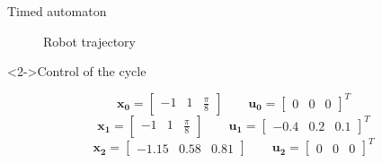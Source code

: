 \documentclass[10pt, xcolor={usenames, dvipsnames}]{beamer}
\begin{document}
\begin{frame}{Timed automaton}
\begin{minipage}[c]{.45\textwidth}
\begin{figure}
                    \caption{Robot trajectory}
                \end{figure}
            \end{minipage}
            \begin{minipage}{.85\textwidth}
                \begin{block}<2->{Control of the cycle}
                    \vspace{2.5mm}
                    \begin{overprint}
                        $$\mathbf{x_0} = \begin{bmatrix}-1& 1& \frac{\pi}{8}\end{bmatrix} \qquad \mathbf{u_0} = \begin{bmatrix}0& 0& 0\end{bmatrix}^T$$
                        $$\mathbf{x_1} = \begin{bmatrix}-1& 1& \frac{\pi}{8}\end{bmatrix} \qquad \mathbf{u_1} = \begin{bmatrix}-0.4& 0.2& 0.1\end{bmatrix}^T$$
                        $$\mathbf{x_2} = \begin{bmatrix}-1.15& 0.58& 0.81\end{bmatrix} \qquad \mathbf{u_2} = \begin{bmatrix}0& 0& 0\end{bmatrix}^T$$
                    \end{overprint}
                \end{block}
            \end{minipage}
        \end{frame}
\end{document}
